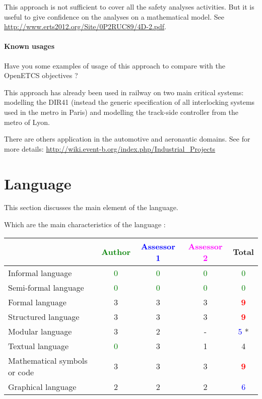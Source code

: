 \begin{author_comment}
This approach is not sufficient to cover all the safety analyses activities. But it is useful to give confidence on the analyses on a mathematical model. See \url{http://www.erts2012.org/Site/0P2RUC89/4D-2.pdf}.
\end{author_comment}


\paragraph{Known usages} Have you some examples of usage of this approach to  compare with the OpenETCS objectives ?


\begin{author_comment}
This approach has already been used in railway on two  main critical systems: modelling the DIR41 (instead the generic specification of all interlocking systems used in the metro in Paris)  and modelling the track-side controller from the metro of Lyon. 

There are others application in the automotive and aeronautic domains. See for more details: \url{http://wiki.event-b.org/index.php/Industrial_Projects}
\end{author_comment}


\section{Language}
This section discusses the main element of the language.

Which are the main characteristics of the language :

\begin{tabular}{|l | c | c | c | c|}
\hline
& \textcolor{green}{Author} & \textcolor{blue}{Assessor 1} & \textcolor{magenta}{Assessor 2} & Total \\
\hline 
Informal language & \textcolor{green}{0} & \textcolor{green}{0} & \textcolor{green}{0} & \textcolor{green}{0}  \\
\hline 
Semi-formal language & \textcolor{green}{0} & \textcolor{green}{0} & \textcolor{green}{0} & \textcolor{green}{0} \\
\hline
Formal language & 3    & 3    & 3    & \textcolor{red}{\textbf{9}} \\
\hline
Structured language & 3    & 3    & 3    & \textcolor{red}{\textbf{9}} \\
\hline
Modular language & 3    & 2    & - & \textcolor{blue}{5} * \\
\hline
Textual language & \textcolor{green}{0} & 3    & 1    & 4    \\
\hline
Mathematical symbols or code & 3    & 3    & 3    & \textcolor{red}{\textbf{9}} \\
\hline
Graphical language & 2    & 2    & 2    & \textcolor{blue}{6} \\
\hline
\end{tabular}

